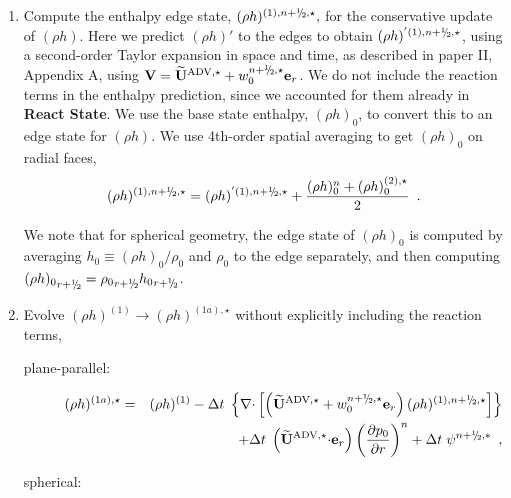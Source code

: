 \begin{description}
\begin{enumerate}
  \begin{enumerate}
  \renewcommand{\labelenumii}{{\bf \roman{enumii}}.}

  \item Compute the enthalpy edge state, $(\rho h)^{(1),\nph,\star},$
    for the conservative update of $(\rho h).$  Here we predict $(\rho
    h)'$ to the edges to obtain $(\rho h)^{'(1),\nph,\star}$, 
    using a second-order Taylor expansion in space
    and time, as described in paper II, Appendix A, using $\Vb =
    \uadvone+w_0^{\nph,\star} \er$.  We do not include the reaction
    terms in the enthalpy prediction, since we accounted for them
    already in {\bf React State}.  We use the base state enthalpy,
    $(\rho h)_0$, to convert this to an edge state for $(\rho h)$.
    We use 4th-order spatial averaging to get $(\rho h)_0$ on radial faces,
\begin{equation}
(\rho h)^{(1),\nph,\star} = 
(\rho h)^{'(1),\nph,\star} + \frac{(\rho h)_0^n + (\rho h)_0^{(2),\star}}{2}
\enskip .
\end{equation}
   
   We note that for spherical geometry, the edge state of $(\rho h)_0$
   is computed by averaging $h_0 \equiv (\rho h)_0/\rho_0$ and $\rho_0$
   to the edge separately, and then computing 
   ${(\rho h)_0}_{r+\myhalf} = {\rho_0}_{r+\myhalf} {h_0}_{r+\myhalf}$.

  \item Evolve $(\rho h)^{(1)} \rightarrow (\rho h)^{(1a),\star}$ without
  explicitly including the reaction terms,

\begin{description}
\item[plane-parallel:]

  \begin{eqnarray}
  (\rho h)^{(1a),\star} &=& (\rho h)^{(1)} - \dt \; \left\{ \nablab
      \cdotb \left[ \left(\uadvone+w_0^{\nph,\star} \er\right) (\rho
      h)^{(1),\nph,\star} \right] \right\} \nonumber \\ && + \dt \;
    \left(\uadvone \cdotb \er\right) \left(\frac{\partial
      p_0}{\partial r} \right)^{n} + \dt \; \psi^{\nph,*} \enskip ,
  \end{eqnarray}

\item[spherical:]


\end{description}
\end{enumerate}
\end{enumerate}
\end{description}
